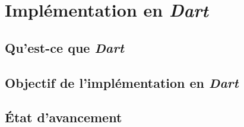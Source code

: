 \section{Implémentation en \emph{Dart}}
  \subsection{Qu'est-ce que \emph{Dart}}
  \subsection{Objectif de l'implémentation en \emph{Dart}}
  \subsection{État d'avancement}

